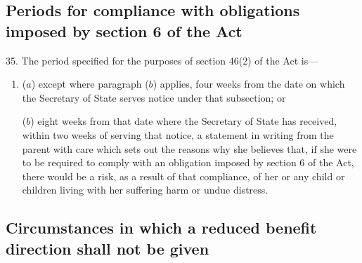 \documentclass[a4paper,12pt]{article}
\begin{document}
%
%

\subsection[35. Periods for compliance with obligations imposed by section 6 of the Act]{Periods for compliance with obligations imposed by section 6 of the Act}

35.  The period specified for the purposes of section 46(2) of the Act is---
\begin{enumerate}\item[]
($a$) except where paragraph ($b$) applies, four weeks from the date on which the Secretary of State serves notice under that subsection; or

($b$) eight weeks from that date where the Secretary of State has received, within two weeks of serving that notice, a statement in writing from the parent with care which sets out the reasons why she believes that, if she were to be required to comply with an obligation imposed by section 6 of the Act, there would be a risk, as a result of that compliance, of her or any child or children living with her suffering harm or undue distress.
\end{enumerate}


\subsection[35A. Circumstances in which a reduced benefit direction shall not be given]{Circumstances in which a reduced benefit direction shall not be given}
\end{document}
